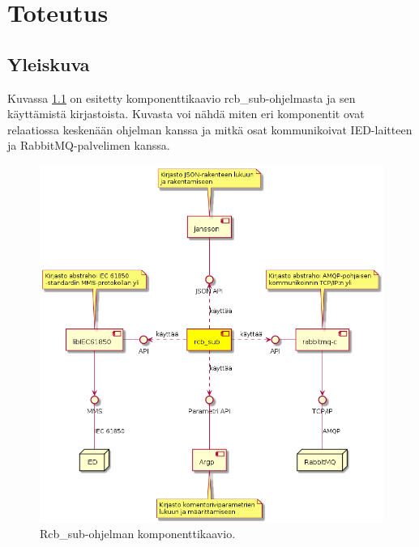\chapter{Toteutus}
\label{ch:toteutus}


\section{Yleiskuva}
\label{ch:rcb-sub-yleiskuva}
Kuvassa \ref{fig:rcb-sub-komponenttikaavio} on esitetty komponenttikaavio rcb\_sub-ohjelmasta ja sen käyttämistä kirjastoista. Kuvasta voi nähdä miten eri komponentit ovat relaatiossa keskenään ohjelman kanssa ja mitkä osat kommunikoivat IED-laitteen ja RabbitMQ-palvelimen kanssa.

\begin{figure}[ht!]
	\includegraphics[width=1\textwidth]{pictures/rcb-sub-component-diagram.png}
	\caption{Rcb\_sub-ohjelman komponenttikaavio.}
	\label{fig:rcb-sub-komponenttikaavio}
\end{figure}


